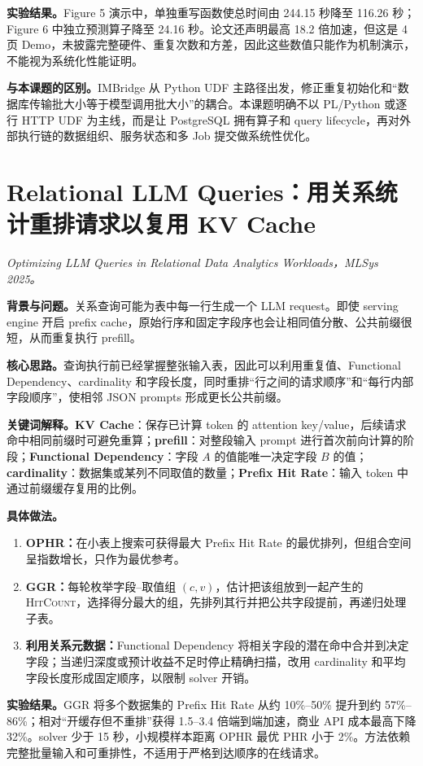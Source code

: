 \documentclass[10pt,a4paper]{ctexart}
\let\digestoriginalsection\section
\renewcommand{\section}{\Needspace{7\baselineskip}\digestoriginalsection}
\newcommand{\paperinfo}[1]{\textit{#1}\par}
\newcommand{\field}[1]{\par\noindent\textbf{#1。}\hspace{0.25em}}
\begin{document}
\field{实验结果}Figure 5 演示中，单独重写函数使总时间由 244.15 秒降至 116.26 秒；Figure 6 中独立预测算子降至 24.16 秒。论文还声明最高 18.2 倍加速，但这是 4 页 Demo，未披露完整硬件、重复次数和方差，因此这些数值只能作为机制演示，不能视为系统化性能证明。

\field{与本课题的区别}IMBridge 从 Python UDF 主路径出发，修正重复初始化和“数据库传输批大小等于模型调用批大小”的耦合。本课题明确不以 PL/Python 或逐行 HTTP UDF 为主线，而是让 PostgreSQL 拥有算子和 query lifecycle，再对外部执行链的数据组织、服务状态和多 Job 提交做系统性优化。

\section{Relational LLM Queries：用关系统计重排请求以复用 KV Cache}
\paperinfo{Optimizing LLM Queries in Relational Data Analytics Workloads，MLSys 2025。}

\field{背景与问题}关系查询可能为表中每一行生成一个 LLM request。即使 serving engine 开启 prefix cache，原始行序和固定字段序也会让相同值分散、公共前缀很短，从而重复执行 prefill。

\field{核心思路}查询执行前已经掌握整张输入表，因此可以利用重复值、Functional Dependency、cardinality 和字段长度，同时重排“行之间的请求顺序”和“每行内部字段顺序”，使相邻 JSON prompts 形成更长公共前缀。

\field{关键词解释}\textbf{KV Cache}：保存已计算 token 的 attention key/value，后续请求命中相同前缀时可避免重算；\textbf{prefill}：对整段输入 prompt 进行首次前向计算的阶段；\textbf{Functional Dependency}：字段 $A$ 的值能唯一决定字段 $B$ 的值；\textbf{cardinality}：数据集或某列不同取值的数量；\textbf{Prefix Hit Rate}：输入 token 中通过前缀缓存复用的比例。

\field{具体做法}
\begin{enumerate}
  \item \textbf{OPHR：}在小表上搜索可获得最大 Prefix Hit Rate 的最优排列，但组合空间呈指数增长，只作为最优参考。
  \item \textbf{GGR：}每轮枚举字段--取值组 $(c,v)$，估计把该组放到一起产生的 \textsc{HitCount}，选择得分最大的组，先排列其行并把公共字段提前，再递归处理子表。
  \item \textbf{利用关系元数据：}Functional Dependency 将相关字段的潜在命中合并到决定字段；当递归深度或预计收益不足时停止精确扫描，改用 cardinality 和平均字段长度形成固定顺序，以限制 solver 开销。
\end{enumerate}

\field{实验结果}GGR 将多个数据集的 Prefix Hit Rate 从约 10\%--50\% 提升到约 57\%--86\%；相对“开缓存但不重排”获得 1.5--3.4 倍端到端加速，商业 API 成本最高下降 32\%。solver 少于 15 秒，小规模样本距离 OPHR 最优 PHR 小于 2\%。方法依赖完整批量输入和可重排性，不适用于严格到达顺序的在线请求。
\end{document}
